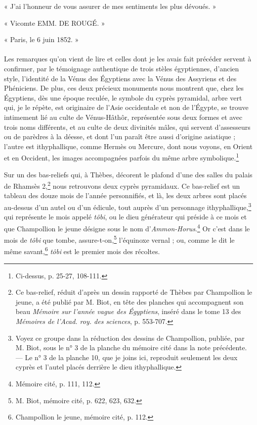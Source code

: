 \documentclass{article}
\begin{document}
« J'ai l'honneur de vous assurer de mes sentiments les plus dévoués. »

\begin{center}
« Vicomte EMM. DE ROUGÉ. »

« Paris, le 6 juin 1852. »
\end{center}

\paragraph{}
Les remarques qu'on vient de lire et celles dont je les avais fait précéder servent à confirmer, par le témoignage authentique de trois stèles égyptiennes, d'ancien style, l'identité de la Vénus des Égyptiens avec la Vénus des Assyriens et des Phéniciens. De plus, ces deux précieux monuments nous montrent que, chez les Égyptiens, dès une époque reculée, le symbole du cyprès pyramidal, arbre vert qui, je le répète, est originaire de l'Asie occidentale et non de l'Égypte, se trouve intimement lié au culte de Vénus-Hâthôr, représentée sous deux formes et avec trois noms différents, et au culte de deux divinités mâles, qui servent d'assesseurs ou de parèdres à la déesse, et dont l'un paraît être aussi d'origine asiatique ; l'autre est ithyphallique, comme Hermès ou Mercure, dont nous voyons, en Orient et en Occident, les images accompagnées parfois du même arbre symbolique.\footnote{Ci-dessus, p. 25-27, 108-111.}

Sur un des bas-reliefs qui, à Thèbes, décorent le plafond d'une des salles du palais de Rhamsès 2,\footnote{Ce bas-relief, réduit d'après un dessin rapporté de Thèbes par Champollion le jeune, a été publié par M. Biot, en tête des planches qui accompagnent son beau \emph{Mémoire sur l'année vague des Égyptiens}, inséré dans le tome 13 des \emph{Mémoires de l'Acad. roy. des sciences}, p. 553-707.} nous retrouvons deux cyprès pyramidaux. Ce bas-relief est un tableau des douze mois de l'année personnifiés, et là, les deux arbres sont placés au-dessus d'un autel ou d'un édicule, tout auprès d'un personnage ithyphallique,\footnote{Voyez ce groupe dans la réduction des dessins de Champollion, publiée, par M. Biot, sous le n° 3 de la planche du mémoire cité dans la note précédente. --- Le n° 3 de la planche 10, que je joins ici, reproduit seulement les deux cyprès et l'autel placés derrière le dieu ithyphallique.} qui représente le mois appelé \emph{tôbi}, ou le dieu générateur qui préside à ce mois et que Champollion le jeune désigne sous le nom d'\emph{Ammon-Horus}.\footnote{Mémoire cité, p. 111, 112.} Or c'est dans le mois de \emph{tôbi} que tombe, assure-t-on,\footnote{M. Biot, mémoire cité, p. 622, 623, 632.} l'équinoxe vernal ; ou, comme le dit le même savant,\footnote{Champollion le jeune, mémoire cité, p. 112.} \emph{tôbi} est le premier mois des récoltes.
\end{document}
